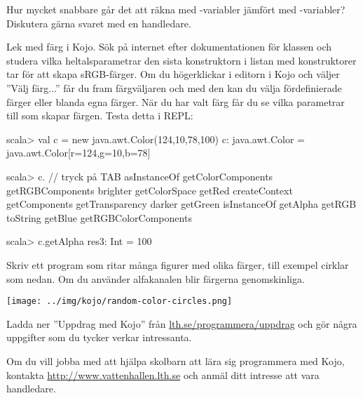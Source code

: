 \Subtask Hur mycket snabbare går det att räkna med -variabler jämfört med -variabler? Diskutera gärna svaret med en handledare.

\Task Lek med färg i Kojo. Sök på internet efter dokumentationen för klassen  och studera vilka heltalsparametrar den sista konstruktorn i listan med konstruktorer tar för att skapa sRGB-färger. Om du högerklickar i editorn i Kojo och väljer ''Välj färg...'' får du fram färgväljaren och med den kan du välja fördefinierade färger eller blanda egna färger. När du har valt färg får du se vilka parametrar till  som skapar färgen. Testa detta i REPL:

\begin{REPL}
scala> val c = new java.awt.Color(124,10,78,100)
c: java.awt.Color = java.awt.Color[r=124,g=10,b=78]

scala> c.  // tryck på TAB
asInstanceOf    getColorComponents      getRGBComponents
brighter        getColorSpace           getRed
createContext   getComponents           getTransparency
darker          getGreen                isInstanceOf
getAlpha        getRGB                  toString
getBlue         getRGBColorComponents

scala> c.getAlpha
res3: Int = 100
\end{REPL}
Skriv ett program som ritar många figurer med olika färger, till exempel cirklar som nedan. Om du använder alfakanalen blir färgerna genomskinliga.

\texttt{[image: ../img/kojo/random-color-circles.png]}


\Task Ladda ner ''Uppdrag med Kojo'' från \href{http://lth.se/programmera/uppdrag}{lth.se/programmera/uppdrag}  och gör några uppgifter som du tycker verkar intressanta.


\Task Om du vill jobba med att hjälpa skolbarn att lära sig programmera med Kojo, kontakta \url{http://www.vattenhallen.lth.se} och anmäl ditt intresse att vara handledare.
